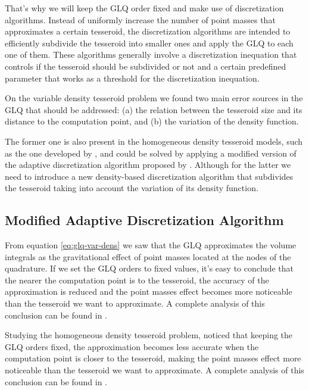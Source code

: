 \documentclass[extra]{gji}
\begin{document}
That's why we will keep the GLQ order fixed and make use of 
discretization algorithms.
Instead of uniformly increase the number of point masses that 
approximates a certain tesseroid, the discretization algorithms are 
intended to efficiently subdivide the tesseroid into smaller ones and 
apply the GLQ to each one of them.
These algorithms generally involve a discretization inequation that 
controls if the tesseroid should be subdivided or not and a certain 
predefined parameter that works as a threshold for the discretization 
inequation.

On the variable density tesseroid problem we found two main error 
sources in the GLQ that should be addressed: (a) the relation between 
the tesseroid size and its distance to the computation point, and (b) 
the variation of the density function.

The former one is also present in the homogeneous density tesseroid 
models, such as the one developed by \citet{Uieda2016}, and could be 
solved by applying a modified version of the adaptive discretization 
algorithm proposed by \citet{Li2011}.
Although for the latter we need to introduce a new density-based 
discretization algorithm that subdivides the tesseroid taking into 
account the variation of its density function.


\subsection{Modified Adaptive Discretization Algorithm}

From equation \ref{eq:glq-var-dens} we saw that the GLQ approximates 
the volume integrals as the gravitational effect of point masses 
located at the nodes of the quadrature. If we set the GLQ orders to 
fixed values, it's easy to conclude that the nearer the computation 
point is to the tesseroid, the accuracy of the approximation is reduced 
and the point masses effect becomes more noticeable than the tesseroid 
we want to approximate. A complete analysis of this conclusion can be 
found in \citet{Ku1977, Li2011, Uieda2016}.

Studying the homogeneous density tesseroid problem, \citet{Ku1977} 
noticed that keeping the GLQ orders fixed, the approximation 
becomes less accurate when the computation point is closer to the 
tesseroid, making the point masses effect more noticeable than the 
tesseroid we want to approximate.
A complete analysis of this conclusion can be found in \citet{Ku1977, 
Li2011, Uieda2016}.
\end{document}
